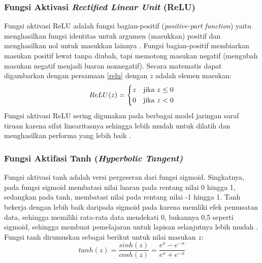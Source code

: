 \subsubsection{Fungsi Aktivasi \emph{Rectified Linear Unit} (ReLU)}
Fungsi aktivasi ReLU adalah fungsi bagian-positif (\emph{positive-part function}) yaitu menghasilkan fungsi identitas untuk argumen (masukkan) positif dan menghasilkan nol untuk masukkan lainnya \citep{Lederer2021}. Fungsi bagian-positif membiarkan masukan positif lewat tanpa diubah, tapi memotong masukan negatif (mengubah masukan negatif menjadi luaran nonnegatif). Secara matematis dapat digambarkan dengan persamaan \eqref{relu} dengan $z$ adalah elemen masukan:
\begin{equation}\label{relu}
    ReLU(z) =
    \begin{dcases}
        z & \text{jika } z \leq 0 \\
        0 & \text{jika } z < 0
    \end{dcases}
\end{equation}
Fungsi aktivasi ReLU sering digunakan pada berbagai model jaringan saraf tiruan karena sifat linearitasnya sehingga lebih mudah untuk dilatih dan menghasilkan performa yang lebih baik \citep{elgendy_2020}.

\subsubsection{Fungsi Aktifasi Tanh (\emph{Hyperbolic Tangent)}}
Fungsi aktivasi tanh adalah versi pergeseran dari fungsi sigmoid. Singkatnya, pada fungsi sigmoid membatasi nilai luaran pada rentang nilai 0 hingga 1, sedangkan pada tanh, membatasi nilai pada rentang nilai -1 hingga 1. Tanh bekerja dengan lebih baik daripada sigmoid pada karena memliki efek pemusatan data, sehingga memiliki rata-rata data mendekati 0, bukannya 0,5 seperti sigmoid, sehingga membuat pemelajaran untuk lapisan selanjutnya lebih mudah \citep*{elgendy_2020}. Fungsi tanh dirumuskan sebagai berikut untuk nilai masukan $z$:
\begin{equation}
    tanh(z) = \frac{sinh(z)}{cosh(z)} = \frac{e^x-e^{-x}}{e^x + e^{-x}}
\end{equation}

